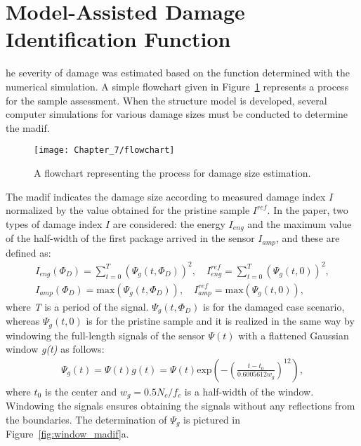 \section{Model-Assisted Damage Identification Function}
\label{sec:madif}

he severity of damage was estimated based on the function determined with the numerical simulation.
A simple flowchart given in Figure~\ref{fig:Flowchart} represents a process for the sample assessment.
When the structure model is developed, several computer simulations for various damage sizes must be conducted to determine the \ac{madif}.
\begin{figure}[H]
	\texttt{[image: Chapter\_7/flowchart]}
	\caption{A flowchart representing the process for damage size estimation.}
	\label{fig:Flowchart}
\end{figure}
The \ac{madif} indicates the damage size according to measured damage index \(I\) normalized by the value obtained for the pristine sample \(I^{ref}\).
In the paper, two types of damage index \(I\) are considered: the energy \(I_{eng}\) and the maximum value of the half-width of the first package arrived in the sensor \(I_{amp}\), and these are defined as:
\begin{eqnarray}
	I_{eng}(\Phi_D)=\sum_{t=0}^{T} \left (\Psi_g(t,\Phi_D)\right )^2,\quad I_{eng}^{ref}=\sum_{t=0}^{T} \left (\Psi_g(t,0)\right )^2,\\
	I_{amp}(\Phi_D)=\mathrm{max}\left ( \Psi_g(t,\Phi_D)\right ),\quad I_{amp}^{ref}=\mathrm{max}\left ( \Psi_g(t,0)\right ),
	\label{eq:I_amp}
\end{eqnarray}
where \textit{T} is a period of the signal.
\(\Psi_g(t,\Phi_D)\) is for the damaged case scenario, whereas \(\Psi_g(t,0)\) is for the pristine sample and it is realized in the same way by windowing the full-length signals of the sensor \(\Psi(t)\) with a flattened Gaussian window \emph{g(t)} as follows:
\begin{eqnarray}
	\Psi_g(t)=\Psi(t)g(t)= \Psi(t)\mathrm{exp}\left(-\left(\frac{t-t_0}{0.6005612w_g}\right) ^{12}\right),
	\label{eq:psi_g}
\end{eqnarray}
where \(t_0\) is the center and \(w_g=0.5N_c/f_c\) is a half-width of the window.
Windowing the signals ensures obtaining the signals without any reflections from the boundaries.
The determination of \(\Psi_g\) is pictured in Figure~\ref{fig:window_madif}a.

